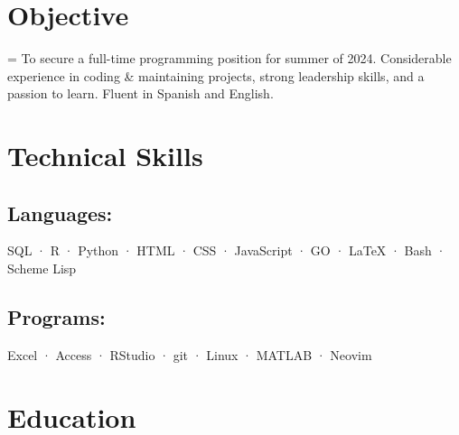 \documentclass[12pt]{article}
\newcommand{\itemspace}{\vspace{0.1870em}}
\renewcommand{\textsc}[1]{\uppercase{\footnotesize#1}\normalsize}
\begin{document}
\maketitle

\vspace{-2.8mm}
\noindent\hrulefill

\vspace{-4.5mm}
\noindent\hrulefill

\itemspace
\section{Objective}

\hangindent=\parindent %
To secure a full-time programming position for summer of 2024.
Considerable experience in coding \& maintaining projects,
strong leadership skills, and a passion to learn. Fluent in Spanish and English.

\itemspace

\section{Technical Skills}

\subsection{Languages:} \:
\textsc{sql} · \textsc{r} · Python · \textsc{html} · \textsc{css} ·
JavaScript · \textsc{go} · \LaTeX{} · Bash · Scheme Lisp

\subsection{Programs:} \:
Excel · Access · RStudio · git ·  Linux · \textsc{MATLAB} · Neovim

\itemspace

\section{Education}
\end{document}
